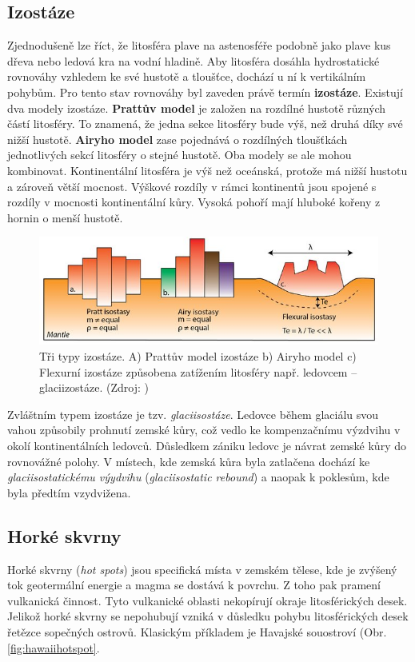 \subsection{Izostáze}
Zjednodušeně lze říct, že litosféra plave na astenosféře podobně jako plave kus dřeva nebo ledová kra na vodní hladině. Aby litosféra dosáhla hydrostatické rovnováhy vzhledem ke své hustotě a tloušťce, dochází u ní k vertikálním pohybům. Pro tento stav rovnováhy byl zaveden právě termín \textbf{izostáze}. Existují dva modely izostáze. \textbf{Prattův model} je založen na rozdílné hustotě různých částí litosféry. To znamená, že jedna sekce litosféry bude výš, než druhá díky své nižší hustotě. \textbf{Airyho model} zase pojednává o rozdílných tloušťkách jednotlivých sekcí litosféry o stejné hustotě. Oba modely se ale mohou kombinovat. Kontinentální litosféra je výš než oceánská, protože má nižší hustotu a zároveň větší mocnost. Výškové rozdíly v rámci kontinentů jsou spojené s rozdíly v mocnosti kontinentální kůry. Vysoká pohoří mají hluboké kořeny z hornin o menší hustotě.
\begin{figure}[h]
	\centering
	\includegraphics[width=1\linewidth]{obrazky/tectonic/isostasy}
	\caption{Tři typy izostáze. A) Prattův model izostáze b) Airyho model c) Flexurní izostáze způsobena zatížením litosféry např. ledovcem -- glaciizostáze. (Zdroj: \textcite{beniestContinentalRiftingConjugate2017})}
	\label{fig:isostasy}
\end{figure}

Zvláštním typem izostáze je tzv. \emph{glaciisostáze}. Ledovce během glaciálu svou vahou způsobily prohnutí zemské kůry, což vedlo ke kompenzačnímu výzdvihu v okolí kontinentálních ledovců. Důsledkem zániku ledovc je návrat zemské kůry do rovnovážné polohy. V místech, kde zemská kůra byla zatlačena dochází ke \emph{glaciisostatickému výydvihu} (\textit{glaciisostatic rebound}) a naopak k poklesům, kde byla předtím vzydvižena.
\subsection{Horké skvrny}
Horké skvrny (\textit{hot spots}) jsou specifická místa v zemském tělese, kde je zvýšený tok geotermální energie a magma se dostává k povrchu. Z toho pak pramení vulkanická činnost. Tyto vulkanické oblasti nekopírují okraje litosférických desek. Jelikož horké skvrny se nepohubují vzniká v důsledku pohybu litosférických desek řetězce sopečných ostrovů. Klasickým příkladem je Havajské souostroví (Obr. \ref{fig:hawaiihotspot}.


